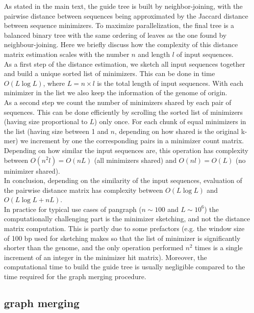 \documentclass[aps,rmp,reprint,superscriptaddress,notitlepage,10pt,onecolumn]{revtex4-1}
\begin{document}
As stated in the main text, the guide tree is built by neighbor-joining, with the pairwise distance between sequences being approximated by the Jaccard distance between sequence minimizers. To maximize parallelization, the final tree is a balanced binary tree with the same ordering of leaves as the one found by neighbour-joining. Here we briefly discuss how the complexity of this distance matrix estimation scales with the number $n$ and length $l$ of input sequences.\\
As a first step of the distance estimation, we sketch all input sequences together and build a unique sorted list of minimizers. This can be done in time $O(L \log L)$, where $L = n \times l$ is the total length of input sequences. With each minimizer in the list we also keep the information of the genome of origin.\\
As a second step we count the number of minimizers shared by each pair of sequences. This can be done efficiently by scrolling the sorted list of minimizers (having size proportional to $L$) only once. For each chunk of equal minimizers in the list (having size between 1 and $n$, depending on how shared is the original k-mer) we increment by one the corresponding pairs in a minimizer count matrix. Depending on how similar the input sequences are, this operation has complexity between $O(n^2 l) = O(nL)$ (all minimizers shared) and $O(nl) = O(L)$ (no minimizer shared).\\
In conclusion, depending on the similarity of the input sequences, evaluation of the pairwise distance matrix has complexity between $O(L \log L)$ and $O(L \log L + nL)$.\\

In practice for typical use cases of pangraph ($n \sim 100$ and $L \sim 10^6$) the computationally challenging part is the minimizer sketching, and not the distance matrix computation. This is partly due to some prefactors (e.g. the window size of 100 bp used for sketching makes so that the list of minimizer is significantly shorter than the genome, and the only operation performed $n^2$ times is a single increment of an integer in the minimizer hit matrix). Moreover, the computational time to build the guide tree is usually negligible compared to the time required for the graph merging procedure.\\

\subsection{graph merging}
\end{document}
